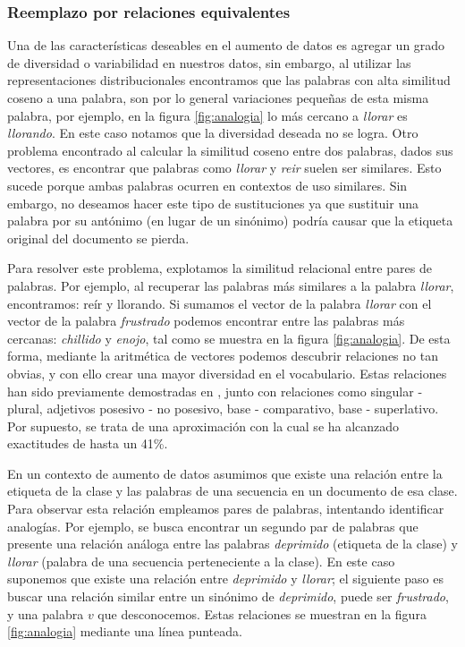 


\subsubsection{Reemplazo por relaciones equivalentes}
Una de las características deseables en el aumento de datos es agregar un grado de diversidad o variabilidad en nuestros datos, sin embargo, al utilizar las representaciones distribucionales encontramos que las palabras con alta similitud coseno a una palabra, son por lo general variaciones pequeñas de esta misma palabra, por ejemplo, en la figura \ref{fig:analogia} lo más cercano a \textit{llorar} es \textit{llorando}. En este caso notamos que la diversidad deseada no se logra. 
Otro problema encontrado al calcular la similitud coseno entre dos palabras, dados sus vectores, es encontrar que palabras como \textit{llorar} y \textit{reir} suelen ser similares. Esto sucede porque ambas palabras ocurren en contextos de uso similares. Sin embargo, no deseamos hacer este tipo de sustituciones ya que sustituir una palabra por su antónimo (en lugar de un sinónimo) podría causar que la etiqueta original del documento se pierda.


Para resolver este problema, explotamos la similitud relacional entre pares de palabras. Por ejemplo, al recuperar las palabras más similares a la palabra \textit{llorar}, encontramos: reír y llorando. Si sumamos el vector de la palabra \textit{llorar} con el vector de la palabra \textit{frustrado} podemos encontrar entre las palabras más cercanas: \textit{chillido} y \textit{enojo}, tal como se muestra en la figura \ref{fig:analogia}. De esta forma, mediante la aritmética de vectores podemos descubrir relaciones no tan obvias, y con ello crear una mayor diversidad en el vocabulario. Estas relaciones han sido previamente demostradas en \citep{mikolov2013linguistic}, junto con relaciones como singular - plural, adjetivos posesivo - no posesivo, base - comparativo, base - superlativo. Por  supuesto, se trata de una aproximación con la cual se ha alcanzado exactitudes de hasta un 41\%. 

En un contexto de aumento de datos asumimos que existe una relación entre la etiqueta de la clase y las palabras de una secuencia en un documento de esa clase. Para observar esta relación empleamos pares de palabras, intentando identificar analogías. Por ejemplo, se busca encontrar un segundo par de palabras que presente una relación análoga entre las palabras \textit{deprimido} (etiqueta de la clase) y \textit{llorar} (palabra de una secuencia perteneciente a la clase). En este caso suponemos que existe una relación entre \textit{deprimido} y \textit{llorar}; el siguiente paso es buscar una relación similar entre un sinónimo de \textit{deprimido}, puede ser \textit{frustrado}, y una palabra $v$ que desconocemos. Estas relaciones se muestran en la figura \ref{fig:analogia} mediante una línea punteada. 

